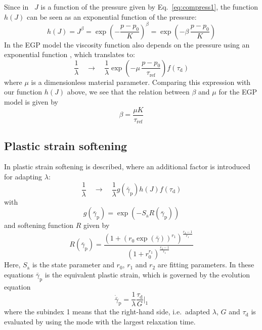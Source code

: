 Since in \tfem\ $J$ is a function of the pressure given by Eq.~\eqref{eq:compress1}, the function $h(J)$ can be seen as an exponential function of the pressure:
\begin{equation}
   h(J) = J^\beta=\exp(-\dfrac{p-p_0}{K})^\beta=\exp(-\beta\,\dfrac{p-p_0}{K})
\end{equation}
In the EGP model the viscosity function also depends on the pressure using an exponential function \cite{van_breemen_rate_2012}, which translates to:
\begin{equation}
    \dfrac1\lambda \quad\rightarrow\quad 
        \dfrac1\lambda\exp(-\mu\,\dfrac{p-p_0}{\tau_\text{ref}}) f(\tau_\text{d})
\end{equation}
where $\mu$ is a dimensionless material parameter. Comparing this expression with our function $h(J)$ above, we see that the relation between $\beta$ and $\mu$ for the EGP model is given by
\begin{equation}
    \beta = \dfrac{\mu K}{\tau_\text{ref}}
\end{equation}

\subsection{Plastic strain softening}
\label{sec:strainsoftening}
In \cite{van_breemen_rate_2012} plastic strain softening is described, where an additional factor is introduced for adapting $\lambda$:
\begin{equation}
    \dfrac1\lambda \quad\rightarrow\quad 
       \dfrac1\lambda g(\bar{\gamma}_\text{p}) h(J) f(\tau_\text{d})
\end{equation}
with
\begin{equation}
   g(\bar{\gamma}_\text{p})=\exp(-S_\text{a}R(\bar{\gamma}_\text{p}))
\end{equation}
and softening function $R$ given by
\begin{equation}
   R(\bar{\gamma}_\text{p})=
    \dfrac{(1+(r_0\exp(\bar{\gamma}))^{r_1})^{\frac{r_2-1}{r_1}}}{(1+r_0^{r_1})^\frac{r_2-1}{r_1}}
\end{equation}
Here, $S_\text{a}$ is the state parameter and $r_0$, $r_1$ and $r_2$ are fitting parameters.
In these equations $\bar{\gamma}_\text{p}$ is the equivalent plastic strain, which is governed by the evolution equation
\begin{equation}
   \dot{\bar{\gamma}}_\text{p}=\dfrac1\lambda \dfrac{\tau_\text{d}}{G}|_1
\end{equation}
where the subindex 1 means that the right-hand side, i.e.\ adapted $\lambda$, $G$ and $\tau_\text{d}$ is evaluated by using the mode with the largest relaxation time.
